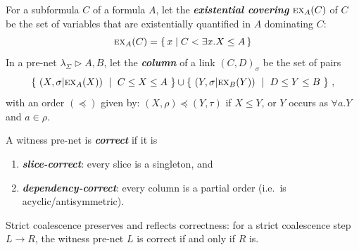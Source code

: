 \documentclass[UKenglish]{lipics-v2016}
\theoremstyle{plain}
\newcommand\defn[1]{\textit{\textbf{#1}}}
\newcommand\ex[2]{\textsc{ex}_{#1}(#2)}
\newcommand\+{+}
\renewcommand\*{\times}
\newcommand\sub{\leq}
\newcommand\dep{\preccurlyeq}
\newcommand\net[3]{#1\triangleright #2,#3}
\newcommand\link[3][\sigma]{(#2,#3)_{#1}}
\newcommand\scoal{\rightarrow} %
\begin{document}
For a subformula $C$ of a formula $A$, let the \defn{existential covering} $\ex AC$ of $C$ be the set of variables that are existentially quantified in $A$ dominating $C$:
\[
	\ex AC = \{\,x \mid C < \exists x.X \sub A\,\}
\]
In a pre-net $\net{\lambda_\Sigma}AB$, let the \defn{column} of a link $\link CD$ be the set of pairs 
\[
	\{~(X,\sigma|\ex AX)~\mid~C\sub X\sub A~\}\cup\{~(Y,\sigma|\ex BY)~\mid~D\sub Y\sub B~\}~,
\]
with an order $(\dep)$ given by: $(X,\rho)\dep(Y,\tau)$ if $X\leq Y$, or $Y$ occurs as $\forall a.Y$ and $a\in\rho$.

\begin{definition}
A witness pre-net is \defn{correct} if it is
\begin{enumerate}
\item \defn{slice-correct}: every slice is a singleton, and
\item \defn{dependency-correct}: every column is a partial order (i.e.\ is acyclic/antisymmetric).
\end{enumerate}
\end{definition}


\begin{lemma}
\label{lem:preservation}
Strict coalescence preserves and reflects correctness: for a strict coalescence step $L\scoal R$, the witness pre-net $L$ is correct if and only if $R$ is.
\end{lemma}
\end{document}
